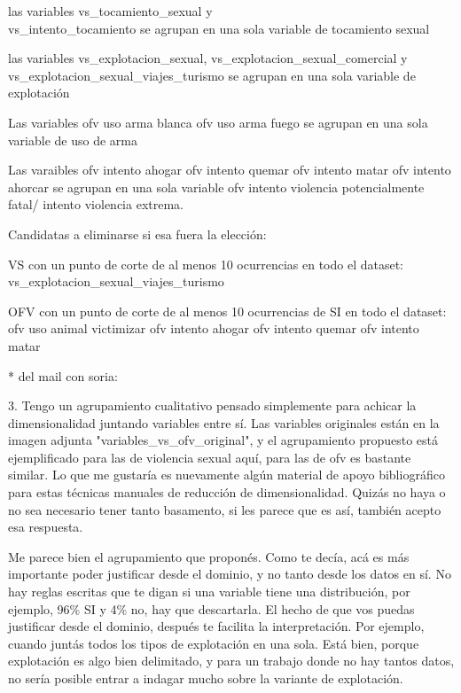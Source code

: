 \documentclass[10 pt]{article}
\begin{document}
las variables vs\_tocamiento\_sexual y \\ vs\_intento\_tocamiento se agrupan en una sola variable de tocamiento sexual



las variables vs\_explotacion\_sexual,  vs\_explotacion\_sexual\_comercial y vs\_explotacion\_sexual\_viajes\_turismo se agrupan en una sola variable de explotación


Las variables ofv uso arma blanca ofv uso arma fuego se agrupan en una sola variable de uso de arma

Las varaibles ofv intento ahogar ofv intento quemar 
ofv intento matar ofv intento ahorcar se agrupan en una sola variable ofv intento violencia potencialmente fatal/ intento violencia extrema.


Candidatas a eliminarse si esa fuera la elección: 

VS con un punto de corte de al menos 10 ocurrencias en todo el dataset: vs\_explotacion\_sexual\_viajes\_turismo



OFV con un punto de corte de al menos 10 ocurrencias de SI en todo el dataset: ofv uso animal victimizar
ofv intento ahogar
ofv intento quemar 
ofv intento matar


* del mail con soria:

3. Tengo un agrupamiento cualitativo pensado simplemente para achicar la dimensionalidad juntando variables entre sí. Las variables originales están en la imagen adjunta "variables\_vs\_ofv\_original", y el agrupamiento propuesto está ejemplificado para las de violencia sexual aquí, para las de ofv es bastante similar. Lo que me gustaría es nuevamente algún material de apoyo bibliográfico para estas técnicas manuales de reducción de dimensionalidad. Quizás no haya o no sea necesario tener tanto basamento, si les parece que es así, también acepto esa respuesta.

Me parece bien el agrupamiento que proponés. Como te decía, acá es más importante poder justificar desde el dominio, y no tanto desde los datos en sí. No hay reglas escritas que te digan si una variable tiene una distribución, por ejemplo, 96\% SI y 4\% no, hay que descartarla.
El hecho de que vos puedas justificar desde el dominio, después te facilita la interpretación. Por ejemplo, cuando juntás todos los tipos de explotación en una sola. Está bien, porque explotación es algo bien delimitado, y para un trabajo donde no hay tantos datos, no sería posible entrar a indagar mucho sobre la variante de explotación.
\end{document}
